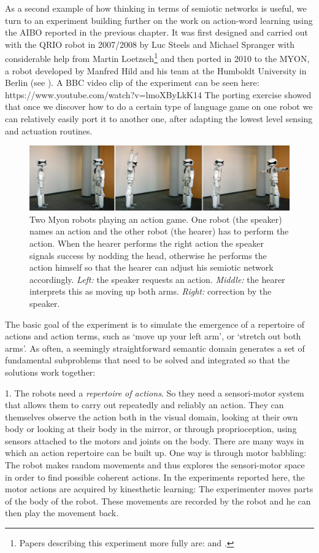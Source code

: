 As a second example of how thinking in terms of semiotic networks is useful,
we turn to an experiment building further on the work on action-word learning 
using the AIBO reported in the previous chapter.
It was first designed and carried out with the QRIO robot in 2007/2008 by Luc Steels and
Michael Spranger with considerable help from Martin Loetzsch\footnote{Papers describing this experiment more fully are: 
\cite{Steels:2008spatial} and \cite{Steels:2008b}.} and 
then ported in 2010 to the MYON, a robot developed by Manfred Hild and his team at the Humboldt 
University in Berlin (see ).\cite{Steels:2012b}
A BBC video clip of the experiment can be seen here: https://www.youtube.com/watch?v=lmoXByLkK14
The porting exercise showed that once we discover how to do a certain type of language game on one robot 
we can relatively easily port it to another one, after adapting the lowest level sensing and actuation routines. 
\begin{figure}[htbp]
  \centerline{\includegraphics[width=1.0\textwidth]{chap11/figs/myon-action-game}}
\caption{
Two Myon robots playing an action game. One robot (the speaker) names an action and the other robot (the hearer) 
has to perform the action. When the hearer performs the right action the speaker signals success by nodding the head, 
otherwise he performs the action himself so that the hearer can adjust his semiotic network accordingly. {\itshape Left:} the speaker
requests an action. {\itshape Middle:} the hearer interprets this as moving up both arms. {\itshape Right:} correction by the speaker. 
}\label{fig:myon-action} 
\end{figure}

The basic goal of the experiment is to simulate the emergence of a repertoire of actions and action terms, such as 
`move up your left arm', or `stretch out both arms'. As often, a seemingly straightforward semantic domain generates 
a set of fundamental subproblems that need to be solved and integrated so that the solutions work together: 

1. The robots need a {\itshape repertoire of actions}. So they need a sensori-motor system that allows them to carry out 
repeatedly and reliably an action. They can themselves observe the action both in the visual domain,  
looking at their own body or looking at their body in the mirror, or through proprioception, using sensors attached 
to the motors and joints on the body. There are many ways in which an action repertoire can be built up. One way 
is through motor babbling: The robot makes random movements and thus explores the sensori-motor 
space in order to find possible coherent actions. In the experiments reported here, the motor actions are acquired 
by kinesthetic learning: The experimenter moves parts of the body of the robot. These movements are recorded by the robot
and he can then play the movement back. 


